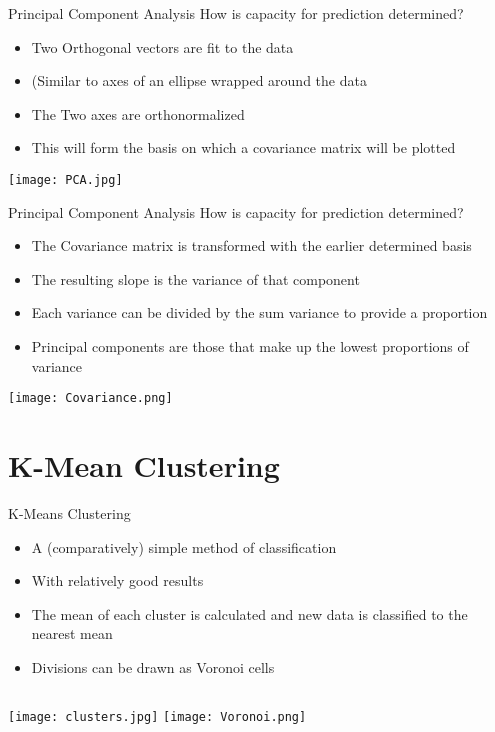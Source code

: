 \documentclass{beamer}
\begin{document}
\begin{frame}{Principal Component Analysis}
	How is capacity for prediction determined?
	\begin{itemize}
		\item Two Orthogonal vectors are fit to the data
		\item[] (Similar to axes of an ellipse wrapped around the data
		\item The Two axes are orthonormalized
		\item This will form the basis on which a covariance matrix will be plotted
	\end{itemize}
	\centering
	\texttt{[image: PCA.jpg]}
\end{frame}

\begin{frame}{Principal Component Analysis}
	How is capacity for prediction determined?
	\begin{itemize}
		\item The Covariance matrix is transformed with the earlier determined basis
		\item The resulting slope is the variance of that component
		\item Each variance can be divided by the sum variance to provide a proportion
		\item Principal components are those that make up the lowest proportions of variance
	\end{itemize}
	\centering
	\texttt{[image: Covariance.png]}
\end{frame}

\section[K-Means]{K-Mean Clustering}

\begin{frame}{K-Means Clustering}
	\begin{itemize}
		\item A (comparatively) simple method of classification
		\item[] With relatively good results
		\item The mean of each cluster is calculated and new data is classified to the nearest mean
		\item Divisions can be drawn as Voronoi cells
	\end{itemize}
	\vspace{0.25em}
	\begin{columns}
		\centering
		\texttt{[image: clusters.jpg]}
		\centering
		\texttt{[image: Voronoi.png]}
	\end{columns}	
\end{frame}
\end{document}
